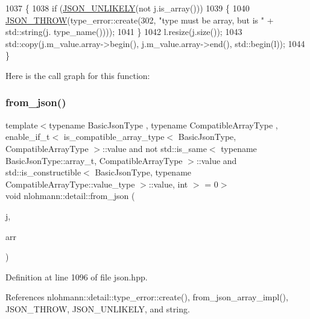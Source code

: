 \begin{DoxyCode}
1037 \{
1038     \textcolor{keywordflow}{if} (\hyperlink{json_8hpp_ab77582407c64944e7db1ea95ab520253}{JSON\_UNLIKELY}(not j.is\_array()))
1039     \{
1040         \hyperlink{json_8hpp_a6c274f6db2e65c1b66c7d41b06ad690f}{JSON\_THROW}(type\_error::create(302, \textcolor{stringliteral}{"type must be array, but is "} + std::string(j.
      type\_name())));
1041     \}
1042     l.resize(j.size());
1043     std::copy(j.m\_value.array->begin(), j.m\_value.array->end(), std::begin(l));
1044 \}
\end{DoxyCode}
Here is the call graph for this function\+:
\mbox{\label{namespacenlohmann_1_1detail_a8dcac00852dbe1f61d1e78135b19d428}} 
\subsubsection{\texorpdfstring{from\+\_\+json()}{from\_json()}\hspace{0.1cm}{\footnotesize\ttfamily [10/14]}}
{\footnotesize\ttfamily template$<$typename Basic\+Json\+Type , typename Compatible\+Array\+Type , enable\+\_\+if\+\_\+t$<$ is\+\_\+compatible\+\_\+array\+\_\+type$<$ Basic\+Json\+Type, Compatible\+Array\+Type $>$\+::value and not std\+::is\+\_\+same$<$ typename Basic\+Json\+Type\+::array\+\_\+t, Compatible\+Array\+Type $>$\+::value and std\+::is\+\_\+constructible$<$ Basic\+Json\+Type, typename Compatible\+Array\+Type\+::value\+\_\+type $>$\+::value, int $>$  = 0$>$ \\
void nlohmann\+::detail\+::from\+\_\+json (\begin{DoxyParamCaption}\item[{const Basic\+Json\+Type \&}]{j,  }\item[{Compatible\+Array\+Type \&}]{arr }\end{DoxyParamCaption})}



Definition at line 1096 of file json.\+hpp.



References nlohmann\+::detail\+::type\+\_\+error\+::create(), from\+\_\+json\+\_\+array\+\_\+impl(), J\+S\+O\+N\+\_\+\+T\+H\+R\+OW, J\+S\+O\+N\+\_\+\+U\+N\+L\+I\+K\+E\+LY, and string.


